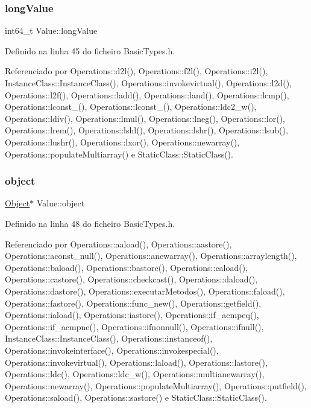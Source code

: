 \subsubsection{\texorpdfstring{long\+Value}{longValue}}
{\footnotesize\ttfamily int64\+\_\+t Value\+::long\+Value}



Definido na linha 45 do ficheiro Basic\+Types.\+h.



Referenciado por Operations\+::d2l(), Operations\+::f2l(), Operations\+::i2l(), Instance\+Class\+::\+Instance\+Class(), Operations\+::invokevirtual(), Operations\+::l2d(), Operations\+::l2f(), Operations\+::ladd(), Operations\+::land(), Operations\+::lcmp(), Operations\+::lconst\+\_(), Operations\+::lconst\+\_(), Operations\+::ldc2\+\_\+w(), Operations\+::ldiv(), Operations\+::lmul(), Operations\+::lneg(), Operations\+::lor(), Operations\+::lrem(), Operations\+::lshl(), Operations\+::lshr(), Operations\+::lsub(), Operations\+::lushr(), Operations\+::lxor(), Operations\+::newarray(), Operations\+::populate\+Multiarray() e Static\+Class\+::\+Static\+Class().

\mbox{\label{structValue_a39c8a4a3203f603f82f1c80561bc735b}} 
\subsubsection{\texorpdfstring{object}{object}}
{\footnotesize\ttfamily \hyperlink{classObject}{Object}$\ast$ Value\+::object}



Definido na linha 48 do ficheiro Basic\+Types.\+h.



Referenciado por Operations\+::aaload(), Operations\+::aastore(), Operations\+::aconst\+\_\+null(), Operations\+::anewarray(), Operations\+::arraylength(), Operations\+::baload(), Operations\+::bastore(), Operations\+::caload(), Operations\+::castore(), Operations\+::checkcast(), Operations\+::daload(), Operations\+::dastore(), Operations\+::executar\+Metodos(), Operations\+::faload(), Operations\+::fastore(), Operations\+::func\+\_\+new(), Operations\+::getfield(), Operations\+::iaload(), Operations\+::iastore(), Operations\+::if\+\_\+acmpeq(), Operations\+::if\+\_\+acmpne(), Operations\+::ifnonnull(), Operations\+::ifnull(), Instance\+Class\+::\+Instance\+Class(), Operations\+::instanceof(), Operations\+::invokeinterface(), Operations\+::invokespecial(), Operations\+::invokevirtual(), Operations\+::laload(), Operations\+::lastore(), Operations\+::ldc(), Operations\+::ldc\+\_\+w(), Operations\+::multianewarray(), Operations\+::newarray(), Operations\+::populate\+Multiarray(), Operations\+::putfield(), Operations\+::saload(), Operations\+::sastore() e Static\+Class\+::\+Static\+Class().

